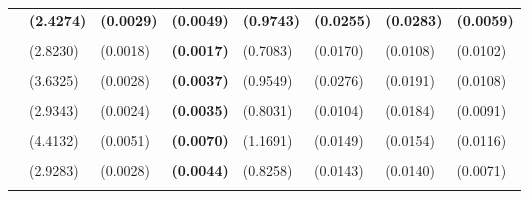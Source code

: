 \documentclass[
  12pt,
]{article}
\begin{document}
\begin{table}[H]
{\begin{tabular}[t]{lll>{}lllll}
\textbf{} & \textbf{(2.4274)} & \textbf{(0.0029)} & \textbf{\textbf{(0.0049)}} & \textbf{(0.9743)} & \textbf{(0.0255)} & \textbf{(0.0283)} & \textbf{(0.0059)}\\
\addlinespace
\cellcolor{gray!6}{c.stm.r15} & \cellcolor{gray!6}{-65.4667} & \cellcolor{gray!6}{0.6950} & \textbf{\cellcolor{gray!6}{0.6349}} & \cellcolor{gray!6}{3.7851} & \cellcolor{gray!6}{0.3723} & \cellcolor{gray!6}{0.3216} & \cellcolor{gray!6}{0.2424}\\
 & (2.8230) & (0.0018) & \textbf{(0.0017)} & (0.7083) & (0.0170) & (0.0108) & (0.0102)\\
\addlinespace
\cellcolor{gray!6}{c.hp400k.r15} & \cellcolor{gray!6}{-58.7622} & \cellcolor{gray!6}{0.6830} & \textbf{\cellcolor{gray!6}{0.6330}} & \cellcolor{gray!6}{4.2265} & \cellcolor{gray!6}{0.3756} & \cellcolor{gray!6}{0.3051} & \cellcolor{gray!6}{0.2352}\\
 & (3.6325) & (0.0028) & \textbf{(0.0037)} & (0.9549) & (0.0276) & (0.0191) & (0.0108)\\
\addlinespace
\cellcolor{gray!6}{c.linear} & \cellcolor{gray!6}{-87.1078} & \cellcolor{gray!6}{0.7045} & \textbf{\cellcolor{gray!6}{0.6328}} & \cellcolor{gray!6}{4.8208} & \cellcolor{gray!6}{0.4265} & \cellcolor{gray!6}{0.3040} & \cellcolor{gray!6}{0.2747}\\
 & (2.9343) & (0.0024) & \textbf{(0.0035)} & (0.8031) & (0.0104) & (0.0184) & (0.0091)\\
\addlinespace
\cellcolor{gray!6}{c.hp221k} & \cellcolor{gray!6}{-79.5029} & \cellcolor{gray!6}{0.7001} & \textbf{\cellcolor{gray!6}{0.6311}} & \cellcolor{gray!6}{3.6423} & \cellcolor{gray!6}{0.3779} & \cellcolor{gray!6}{0.3165} & \cellcolor{gray!6}{0.2434}\\
 & (4.4132) & (0.0051) & \textbf{(0.0070)} & (1.1691) & (0.0149) & (0.0154) & (0.0116)\\
\addlinespace
\cellcolor{gray!6}{c.stm} & \cellcolor{gray!6}{-71.3061} & \cellcolor{gray!6}{0.6881} & \textbf{\cellcolor{gray!6}{0.6298}} & \cellcolor{gray!6}{2.9453} & \cellcolor{gray!6}{0.4040} & \cellcolor{gray!6}{0.3153} & \cellcolor{gray!6}{0.2631}\\
 & (2.9283) & (0.0028) & \textbf{(0.0044)} & (0.8258) & (0.0143) & (0.0140) & (0.0071)\\
\addlinespace
\cellcolor{gray!6}{c.hp400k.r20} & \cellcolor{gray!6}{-74.2327} & \cellcolor{gray!6}{0.6940} & \textbf{\cellcolor{gray!6}{0.6286}} & \cellcolor{gray!6}{3.7081} & \cellcolor{gray!6}{0.3932} & \cellcolor{gray!6}{0.3165} & \cellcolor{gray!6}{0.2554}\\

\end{tabular}}
\end{table}
\end{document}
